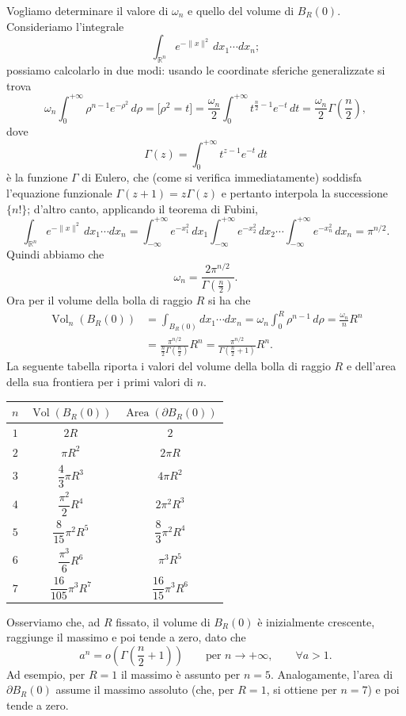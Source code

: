 \documentclass[11pt,a4paper]{article}
\newcommand{\R}{\mathbb{R}}
\begin{document}
Vogliamo determinare il valore di $\omega_n$ e quello del volume di $B_R(0)$. Consideriamo l'integrale
\[
\int_{\R^n}e^{-\lVert x\rVert^2}\,dx_1\cdots dx_n;
\]
possiamo calcolarlo in due modi: usando le coordinate sferiche generalizzate si trova
\[
\omega_n\int_0^{+\infty}\rho^{n-1}e^{-\rho^2}\,d\rho
=\bigl[\rho^2=t\bigr]
=\frac{\omega_n}{2}\int_0^{+\infty}t^{\frac n2-1}e^{-t}\,dt
=\frac{\omega_n}{2}\Gamma\!\left(\frac n2\right),
\]
dove
\[
\Gamma(z)=\int_0^{+\infty}t^{z-1}e^{-t}\,dt
\]
è la funzione $\Gamma$ di Eulero, che (come si verifica immediatamente) soddisfa l'equazione funzionale $\Gamma(z+1)=z\Gamma(z)$ e pertanto interpola la successione $\{n!\}$; d'altro canto, applicando il teorema di Fubini,
\[
\int_{\R^n}e^{-\lVert x\rVert^2}\,dx_1\cdots dx_n
=\int_{-\infty}^{+\infty}e^{-x_1^2}\,dx_1
\int_{-\infty}^{+\infty}e^{-x_2^2}\,dx_2\cdots
\int_{-\infty}^{+\infty}e^{-x_n^2}\,dx_n
=\pi^{n/2}.
\]
Quindi abbiamo che
\[
\omega_n=\frac{2\pi^{n/2}}{\Gamma\!\left(\frac n2\right)}.
\]
Ora per il volume della bolla di raggio $R$ si ha che
\begin{align*}
\operatorname{Vol}_n(B_R(0))
&=\int_{B_R(0)}dx_1\cdots dx_n
=\omega_n\int_0^R\rho^{n-1}\,d\rho
=\frac{\omega_n}{n}R^n\\
&=\frac{\pi^{n/2}}{\frac n2\Gamma\!\left(\frac n2\right)}R^n
=\frac{\pi^{n/2}}{\Gamma\!\left(\frac n2+1\right)}R^n.
\end{align*}
La seguente tabella riporta i valori del volume della bolla di raggio $R$ e dell'area della sua frontiera per i primi valori di $n$.
\begin{center}
\begingroup
\small
\setlength{\tabcolsep}{9pt}
\newcommand{\headstrut}{\rule[-1.3ex]{0pt}{4.3ex}}
\newcommand{\datastrut}{\rule[-2.2ex]{0pt}{6.0ex}}
\begin{tabular}{|c|c|c|}
\hline
\headstrut $n$ & $\operatorname{Vol}(B_R(0))$ & $\operatorname{Area}(\partial B_R(0))$\\
\hline
\datastrut $1$ & $2R$ & $2$\\
\hline
\datastrut $2$ & $\pi R^2$ & $2\pi R$\\
\hline
\datastrut $3$ & $\dfrac{4}{3}\pi R^3$ & $4\pi R^2$\\
\hline
\datastrut $4$ & $\dfrac{\pi^2}{2}R^4$ & $2\pi^2R^3$\\
\hline
\datastrut $5$ & $\dfrac{8}{15}\pi^2R^5$ & $\dfrac{8}{3}\pi^2R^4$\\
\hline
\datastrut $6$ & $\dfrac{\pi^3}{6}R^6$ & $\pi^3R^5$\\
\hline
\datastrut $7$ & $\dfrac{16}{105}\pi^3R^7$ & $\dfrac{16}{15}\pi^3R^6$\\
\hline
\end{tabular}
\endgroup
\end{center}
Osserviamo che, ad $R$ fissato, il volume di $B_R(0)$ è inizialmente crescente, raggiunge il massimo e poi tende a zero, dato che
\[
a^n=o\!\left(\Gamma\!\left(\frac n2+1\right)\right)
\qquad\text{per }n\to+\infty,\qquad \forall a>1.
\]
Ad esempio, per $R=1$ il massimo è assunto per $n=5$.
Analogamente, l'area di $\partial B_R(0)$ assume il massimo assoluto (che, per $R=1$, si ottiene per $n=7$) e poi tende a zero.
\end{document}
